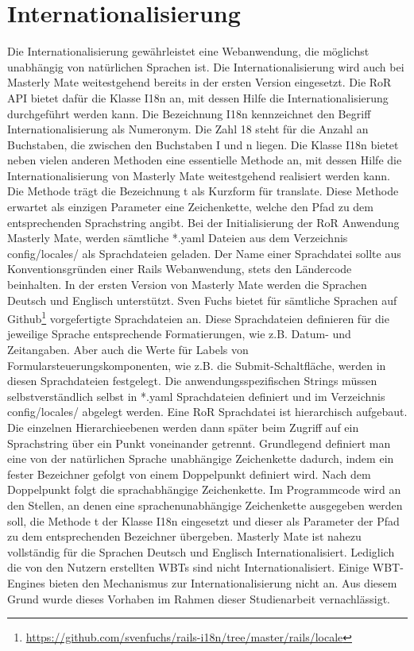 \section{Internationalisierung}\label{ref:internationalisierung}
Die Internationalisierung gewährleistet eine Webanwendung, die möglichst
unabhängig von natürlichen Sprachen ist. Die Internationalisierung wird auch bei
Masterly Mate weitestgehend bereits in der ersten Version eingesetzt.
Die RoR API bietet dafür die Klasse I18n an, mit dessen Hilfe die
Internationalisierung durchgeführt werden kann. Die Bezeichnung I18n
kennzeichnet den Begriff Internationalisierung als Numeronym. Die Zahl 18 steht
für die Anzahl an Buchstaben, die zwischen den Buchstaben I und n liegen.
Die Klasse I18n bietet neben vielen anderen Methoden eine essentielle Methode
an, mit dessen Hilfe die Internationalisierung von Masterly Mate weitestgehend
realisiert werden kann. Die Methode trägt die Bezeichnung t als Kurzform für
translate. Diese Methode erwartet als einzigen Parameter eine Zeichenkette,
welche den Pfad zu dem entsprechenden Sprachstring angibt. Bei der
Initialisierung der RoR Anwendung Masterly Mate, werden sämtliche *.yaml Dateien
aus dem Verzeichnis config/locales/ als Sprachdateien geladen. Der Name einer
Sprachdatei sollte aus Konventionsgründen einer Rails Webanwendung, stets den
Ländercode beinhalten. In der ersten Version von Masterly Mate werden die
Sprachen Deutsch und Englisch unterstützt. Sven Fuchs bietet für sämtliche
Sprachen auf
Github\footnote{\url{https://github.com/svenfuchs/rails-i18n/tree/master/rails/locale}}
vorgefertigte Sprachdateien an. Diese Sprachdateien definieren für die jeweilige
Sprache entsprechende Formatierungen, wie z.B.
Datum- und Zeitangaben. Aber auch die Werte für Labels von
Formularsteuerungskomponenten, wie z.B. die Submit-Schaltfläche, werden in
diesen Sprachdateien festgelegt. Die anwendungsspezifischen Strings müssen
selbstverständlich selbst in *.yaml Sprachdateien definiert und im Verzeichnis
config/locales/ abgelegt werden. Eine RoR Sprachdatei ist hierarchisch
aufgebaut. Die einzelnen Hierarchieebenen werden dann später beim Zugriff auf
ein Sprachstring über ein Punkt voneinander getrennt. Grundlegend definiert man
eine von der natürlichen Sprache unabhängige Zeichenkette dadurch, indem ein
fester Bezeichner gefolgt von einem Doppelpunkt definiert wird. Nach dem
Doppelpunkt folgt die sprachabhängige Zeichenkette. Im Programmcode wird an den
Stellen, an denen eine sprachenunabhängige Zeichenkette ausgegeben werden soll,
die Methode t der Klasse I18n eingesetzt und dieser als Parameter der Pfad zu
dem entsprechenden Bezeichner übergeben.
Masterly Mate ist nahezu vollständig für die Sprachen Deutsch und Englisch
Internationalisiert. Lediglich die von den Nutzern erstellten WBTs sind nicht
Internationalisiert. Einige WBT-Engines bieten den Mechanismus zur
Internationalisierung nicht an. Aus diesem Grund wurde dieses Vorhaben im Rahmen
dieser Studienarbeit vernachlässigt.

